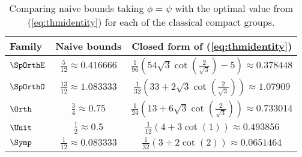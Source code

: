 \begin{table}[h]
	\begin{center}
		\begin{tabular}{|l||c|c|}
			\hline
			\textbf{Family} & \textbf{Naive bounds} & \textbf{Closed form of (\ref{eq:thmidentity})} \\ \hline
			$\SpOrthE$ & $\frac{5}{12} \approx 0.416666$ & $\frac{1}{96} \left(54 \sqrt{3} \cot \left(\frac{2}{\sqrt{3}}\right)-5\right) \approx 0.378448$ \\\hline
			$\SpOrthO$ & $\frac{13}{12} \approx 1.083333$ & $\frac{1}{32} \left(33+2 \sqrt{3} \cot \left(\frac{2}{\sqrt{3}}\right)\right) \approx 1.07909$ \\
			\hline
			$\Orth$ & $\frac34 \approx 0.75$ & $\frac{1}{24} \left(13+6 \sqrt{3} \cot \left(\frac{2}{\sqrt{3}}\right)\right)\approx 0.733014 $\\\hline
			$\Unit$ & $\frac12 \approx 0.5$ & $\frac{1}{12} (4+3 \cot (1)) \approx 0.493856$\\\hline
			$\Symp$ & $\frac{1}{12} \approx 0.083333$ & $\frac{1}{32} (3+2 \cot (2)) \approx 0.0651464$\\\hline
		\end{tabular}
		\caption{Comparing naive bounds taking $\phi = \psi$ with the optimal value from (\ref{eq:thmidentity}) for each of the classical compact groups.} \label{tab:bounds}
	\end{center}
\end{table}

